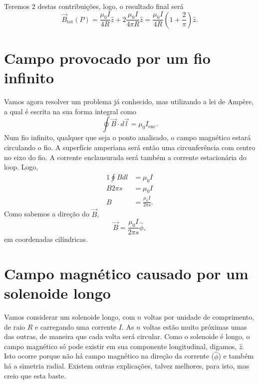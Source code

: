 \documentclass{article}
\begin{document}
Teremos $2$ destas contribuições, logo, o resultado final será
\begin{equation}
 \vec{B}_{\mathrm{tot}}(P) = \frac{\mu_0 I}{4R}\hat{z} + 2\frac{\mu_0 I}{4\pi R}\hat{z}
 = \frac{\mu_0 I}{4R} \left( 1 + \frac{2}{\pi} \right) \hat{z}.
\end{equation}

\section{Campo provocado por um fio infinito}
Vamos agora resolver um problema já conhecido, mas utilizando a lei de Ampère, a qual é escrita na sua forma integral como
\begin{equation}
 \oint \vec{B}\cdot d\vec{l} = \mu_0 I_{\mathrm{enc}}.
\end{equation}
Num fio infinito, qualquer que seja o ponto analisado, o campo magnético estará circulando o fio. A superfície amperiana será então uma circunferência com centro no
eixo do fio. A corrente enclausurada será também a corrente estacionária do loop. Logo,
\begin{alignat}{1}
 \oint B dl &= \mu_0 I\\
 B 2\pi s &= \mu_0 I\\
 B &= \frac{\mu_0 I}{2 \pi s}.
\end{alignat}
Como sabemos a direção do $\vec{B}$,
\begin{equation}
 \vec{B} = \frac{\mu_0 I}{2 \pi s} \hat{\phi},
\end{equation}
em coordenadas cilíndricas.

\section{Campo magnético causado por um solenoide longo}
Vamos considerar um solenoide longo, com $n$ voltas por unidade de comprimento, de raio $R$ e carregando uma corrente $I$. As $n$ voltas estão muito próximas umas das
outras, de maneira que cada volta será circular. Como o solenoide é longo, o campo magnético só pode existir
em sua componente longitudinal, digamos, $\hat{z}$. Isto ocorre porque não há campo magnético na direção da corrente ($\hat{\phi}$) e também há a simetria radial.
Existem outras explicações, talvez melhores, para isto, mas creio que esta baste.
\end{document}
